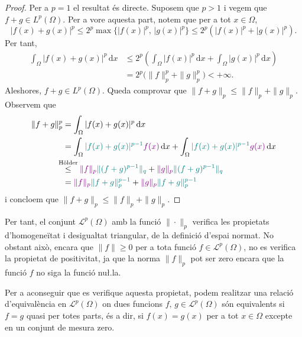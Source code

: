 \documentclass[12pt]{book}
\theoremstyle{definition}
\theoremstyle{nota}
\theoremstyle{exemple}
\begin{document}
\begin{proof}
  Per a $p=1$ el resultat és directe. Suposem que $p > 1$ i vegem que
  $f + g \in L^p(\Omega)$. Per a vore aquesta part, notem que per a
  tot $x \in \Omega$,
  \[
    |f(x) + g(x)|^p \leq 2^p \max\{|f(x)|^p,\,|g(x)|^p\}
    \leq 2^p (|f(x)|^p + |g(x)|^p).
  \]
  Per tant,
  \begin{align*}
    \int_\Omega |f(x) + g(x)|^p\,\mathrm{d}x
    &\leq 2^p \left( \int_\Omega |f(x)|^p \, \mathrm{d}x +
      \int_\Omega |g(x)|^p \, \mathrm{d}x \right) \\
    &= 2^p \big( \|f\|_p^p + \|g\|_p^p \big) < + \infty.
  \end{align*}
  Aleshores, $f + g \in L^p(\Omega)$. Queda comprovar que
  $\|f + g\|_p \leq \|f\|_p + \|g\|_p$. Observem que
  \begin{align*}
    \|f+g\|_p^p
    &= \int_\Omega |f(x) + g(x)|^p \, \mathrm{d}x \\
    &= \int_\Omega \textcolor{teal}{|f(x) + g(x)|^{p-1}}
      \textcolor{violet}{f(x)} \, \mathrm{d}x +
      \int_\Omega \textcolor{teal}{|f(x) + g(x)|^{p-1}}
      \textcolor{violet}{g(x)} \, \mathrm{d}x \\
    &\overset{\mathclap{\text{Hölder}}}{\leq}\;\;\,
      \textcolor{violet}{\|f\|_p}
      \textcolor{teal}{\|(f+g)^{p-1}\|_q} +
      \textcolor{violet}{\|g\|_p}
      \textcolor{teal}{\|(f+g)^{p-1}\|_q} \\
    &= \textcolor{violet}{\|f\|_p}
      \textcolor{teal}{\|f+g\|_p^{p-1}} +
      \textcolor{violet}{\|g\|_p}
      \textcolor{teal}{\|f+g\|_p^{p-1}}
  \end{align*}
  i concloem que $\|f+g\|_p \leq \|f\|_p + \|g\|_p$.
\end{proof}

Per tant, el conjunt $\mathcal{L}^p(\Omega)$ amb la funció
$\|\cdot\|_p$ verifica les propietats d'homogeneïtat i desigualtat
triangular, de la definició d'espai normat. No obstant això, encara
que $\|f\| \geq 0$ per a tota funció $f \in \mathcal{L}^p(\Omega)$, no
es verifica la propietat de positivitat, ja que la norma $\|f\|_p$ pot
ser zero encara que la funció $f$ no siga la funció nu\l.la.

Per a aconseguir que es verifique aquesta propietat, podem realitzar
una relació d'equivalència en $\mathcal{L}^p(\Omega)$ on dues funcions
$f, \, g \in \mathcal{L}^p(\Omega)$ són equivalents si $f = g$ quasi
per totes parts, és a dir, si $f(x) = g(x)$ per a tot $x \in \Omega$
excepte en un conjunt de mesura zero.
\end{document}
